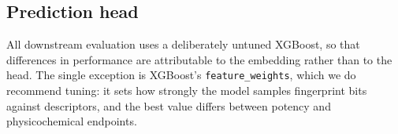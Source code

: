 \subsection{Prediction head}

All downstream evaluation uses a deliberately untuned XGBoost, so that differences in
performance are attributable to the embedding rather than to the head. The single exception is
XGBoost's \texttt{feature\_weights}, which we do recommend tuning: it sets how strongly the model
samples fingerprint bits against descriptors, and the best value differs between potency and
physicochemical endpoints.
